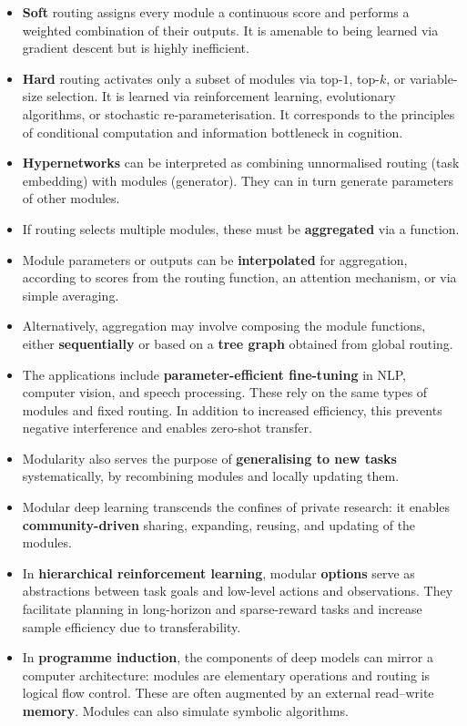 \documentclass[10pt]{article} %
\begin{document}
\begin{tcolorbox}
{\begin{itemize}
        \item \textbf{Soft} routing assigns every module a continuous score and performs a weighted combination of their outputs. It is amenable to being learned via gradient descent but is highly inefficient.
        \item \textbf{Hard} routing activates only a subset of modules via top-$1$, top-$k$, or variable-size selection. It is learned via reinforcement learning, evolutionary algorithms, or stochastic re-parameterisation. It corresponds to the principles of conditional computation and information bottleneck in cognition.
        \item \textbf{Hypernetworks} can be interpreted as combining unnormalised routing (task embedding) with modules (generator). They can in turn generate parameters of other modules.
        \item If routing selects multiple modules, these must be \textbf{aggregated} via a function. \item Module parameters or outputs can be \textbf{interpolated} for aggregation, according to scores from the routing function, an attention mechanism, or via simple averaging.
        \item Alternatively, aggregation may involve composing the module functions, either \textbf{sequentially} or based on a \textbf{tree graph} obtained from global routing.    
        \item The applications include \textbf{parameter-efficient fine-tuning} in NLP, computer vision, and speech processing. These rely on the same types of modules and fixed routing. In addition to increased efficiency, this prevents negative interference and enables zero-shot transfer.
        \item Modularity also serves the purpose of \textbf{generalising to new tasks} systematically, by recombining modules and locally updating them.
        \item Modular deep learning transcends the confines of private research: it enables \textbf{community-driven} sharing, expanding, reusing, and updating of the modules.
        \item In \textbf{hierarchical reinforcement learning}, modular \textbf{options} serve as abstractions between task goals and low-level actions and observations. They facilitate planning in long-horizon and sparse-reward tasks and increase sample efficiency due to transferability. 
        \item In \textbf{programme induction}, the components of deep models can mirror a computer architecture: modules are elementary operations and routing is logical flow control. These are often  augmented by an external read--write \textbf{memory}. Modules can also simulate symbolic algorithms.

\end{itemize}}
\end{tcolorbox}
\end{document}
